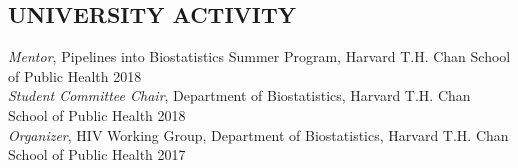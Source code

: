 \documentclass[12pt]{article}
\begin{document}
\subsection*{\textbf{UNIVERSITY ACTIVITY}}
\textit{Mentor}, Pipelines into Biostatistics Summer Program, Harvard T.H. Chan School of
Public Health \hfill \hfill 2018 \\
\textit{Student Committee Chair}, Department of Biostatistics, Harvard T.H. Chan School of
Public Health \hfill \hfill 2018 \\
\textit{Organizer}, HIV Working Group, Department of Biostatistics, Harvard T.H. Chan School of
Public Health \hfill \hfill 2017 
\end{document}
